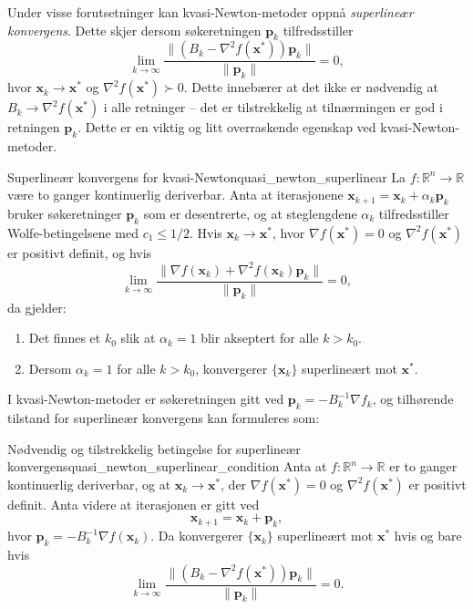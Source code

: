 Under visse forutsetninger kan kvasi-Newton-metoder oppnå \textit{superlineær konvergens}. Dette skjer dersom søkeretningen \( \symbf{p}_k \) tilfredsstiller
\[
	\lim_{k \to \infty} \frac{\| (B_k - \nabla^2 f(\symbf{x}^\ast)) \symbf{p}_k \|}{\|\symbf{p}_k\|} = 0,
\]
hvor \( \symbf{x}_k \to \symbf{x}^\ast \) og \( \nabla^2 f(\symbf{x}^\ast) \succ 0 \). Dette innebærer at det ikke er nødvendig at \( B_k \to \nabla^2 f(\symbf{x}^\ast) \) i alle retninger – det er tilstrekkelig at tilnærmingen er god i retningen \( \symbf{p}_k \). Dette er en viktig og litt overraskende egenskap ved kvasi-Newton-metoder.

\begin{theorem}{Superlineær konvergens for kvasi-Newton}{quasi_newton_superlinear}
	La \( f : \mathbb{R}^n \to \mathbb{R} \) være to ganger kontinuerlig deriverbar. Anta at iterasjonene \( \symbf{x}_{k+1} = \symbf{x}_k + \alpha_k \symbf{p}_k \) bruker søkeretninger \( \symbf{p}_k \) som er desentrerte, og at steglengdene \( \alpha_k \) tilfredsstiller Wolfe-betingelsene med \( c_1 \le 1/2 \). Hvis \( \symbf{x}_k \to \symbf{x}^\ast \), hvor \( \nabla f(\symbf{x}^\ast) = 0 \) og \( \nabla^2 f(\symbf{x}^\ast) \) er positivt definit, og hvis
	\[
		\lim_{k \to \infty} \frac{\| \nabla f(\symbf{x}_k) + \nabla^2 f(\symbf{x}_k) \symbf{p}_k \|}{\|\symbf{p}_k\|} = 0,
	\]
	da gjelder:
	\begin{enumerate}
		\item Det finnes et \( k_0 \) slik at \( \alpha_k = 1 \) blir akseptert for alle \( k > k_0 \).
		\item Dersom \( \alpha_k = 1 \) for alle \( k > k_0 \), konvergerer \( \{\symbf{x}_k\} \) superlineært mot \( \symbf{x}^\ast \).
	\end{enumerate}
\end{theorem}

I kvasi-Newton-metoder er søkeretningen gitt ved \( \symbf{p}_k = -B_k^{-1} \nabla f_k \), og tilhørende tilstand for superlineær konvergens kan formuleres som:

\begin{theorem}{Nødvendig og tilstrekkelig betingelse for superlineær konvergens}{quasi_newton_superlinear_condition}
	Anta at \( f : \mathbb{R}^n \to \mathbb{R} \) er to ganger kontinuerlig deriverbar, og at \( \symbf{x}_k \to \symbf{x}^\ast \), der \( \nabla f(\symbf{x}^\ast) = 0 \) og \( \nabla^2 f(\symbf{x}^\ast) \) er positivt definit. Anta videre at iterasjonen er gitt ved
	\[
		\symbf{x}_{k+1} = \symbf{x}_k + \symbf{p}_k,
	\]
	hvor \( \symbf{p}_k = -B_k^{-1} \nabla f(\symbf{x}_k) \). Da konvergerer \( \{\symbf{x}_k\} \) superlineært mot \( \symbf{x}^\ast \) hvis og bare hvis
	\[
		\lim_{k \to \infty} \frac{\| (B_k - \nabla^2 f(\symbf{x}^\ast)) \symbf{p}_k \|}{\|\symbf{p}_k\|} = 0.
	\]
\end{theorem}

